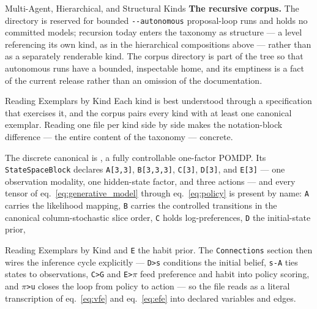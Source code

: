 \documentclass[
  ignorenonframetext,
]{beamer}
\begin{document}
\begin{frame}{Multi-Agent, Hierarchical, and
Structural Kinds}
\textbf{The recursive corpus.} The 
directory is reserved for bounded \texttt{-\/-autonomous} proposal-loop
runs and holds no committed models; recursion today enters the taxonomy
as structure --- a level referencing its own kind, as in the
hierarchical compositions above --- rather than as a separately
renderable kind. The corpus directory is part of the tree so that
autonomous runs have a bounded, inspectable home, and its emptiness is a
fact of the current release rather than an omission of the
documentation.
\end{frame}

\begin{frame}{Reading Exemplars by Kind}
\protect{}\label{reading-exemplars-by-kind}
Each kind is best understood through a specification that exercises it,
and the corpus pairs every kind with at least one canonical exemplar.
Reading one file per kind side by side makes the notation-block
difference --- the entire content of the taxonomy --- concrete.

The discrete canonical is
, a fully
controllable one-factor POMDP. Its \texttt{StateSpaceBlock} declares
\texttt{A{[}3,3{]}}, \texttt{B{[}3,3,3{]}}, \texttt{C{[}3{]}},
\texttt{D{[}3{]}}, and \texttt{E{[}3{]}} --- one observation modality,
one hidden-state factor, and three actions --- and every tensor of
eq.~\ref{eq:generative_model} through eq.~\ref{eq:policy} is present by
name: \texttt{A} carries the likelihood mapping, \texttt{B} carries the
controlled transitions in the canonical column-stochastic slice order,
\texttt{C} holds log-preferences, \texttt{D} the initial-state prior,
\end{frame}

\begin{frame}{Reading Exemplars by Kind}
and \texttt{E} the habit prior. The \texttt{Connections} section then
wires the inference cycle explicitly --- \texttt{D\textgreater{}s}
conditions the initial belief, \texttt{s-A} ties states to observations,
\texttt{C\textgreater{}G} and \texttt{E\textgreater{}\texorpdfstring{\ensuremath{\pi}}{pi}} feed preference
and habit into policy scoring, and \texttt{\texorpdfstring{\ensuremath{\pi}}{pi}\textgreater{}u} closes the
loop from policy to action --- so the file reads as a literal
transcription of eq.~\ref{eq:vfe} and eq.~\ref{eq:efe} into declared
variables and edges.

\end{frame}
\end{document}
